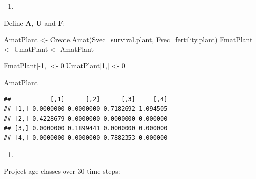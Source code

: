 \documentclass[
]{book}
\newenvironment{Shaded}{\begin{snugshade}}{\end{snugshade}}
\newcommand{\AttributeTok}[1]{\textcolor[rgb]{0.77,0.63,0.00}{#1}}
\newcommand{\DecValTok}[1]{\textcolor[rgb]{0.00,0.00,0.81}{#1}}
\newcommand{\FunctionTok}[1]{\textcolor[rgb]{0.00,0.00,0.00}{#1}}
\newcommand{\NormalTok}[1]{#1}
\newcommand{\OtherTok}[1]{\textcolor[rgb]{0.56,0.35,0.01}{#1}}
\newcommand{\SpecialCharTok}[1]{\textcolor[rgb]{0.00,0.00,0.00}{#1}}
\providecommand{\tightlist}{%
  \setlength{\itemsep}{0pt}\setlength{\parskip}{0pt}}
\begin{document}
\begin{enumerate}
\def\labelenumi{\arabic{enumi}.}
\setcounter{enumi}{2}
\tightlist
\item
\end{enumerate}

Define \(\mathbf{A}\), \(\mathbf{U}\) and \(\mathbf{F}\):

\begin{Shaded}
\begin{Highlighting}[]
\NormalTok{AmatPlant }\OtherTok{\textless{}{-}} \FunctionTok{Create.Amat}\NormalTok{(}\AttributeTok{Svec=}\NormalTok{survival.plant, }
                         \AttributeTok{Fvec=}\NormalTok{fertility.plant)}
\NormalTok{FmatPlant }\OtherTok{\textless{}{-}}\NormalTok{ UmatPlant }\OtherTok{\textless{}{-}}\NormalTok{ AmatPlant}

\NormalTok{FmatPlant[}\SpecialCharTok{{-}}\DecValTok{1}\NormalTok{,] }\OtherTok{\textless{}{-}} \DecValTok{0} 
\NormalTok{UmatPlant[}\DecValTok{1}\NormalTok{,] }\OtherTok{\textless{}{-}} \DecValTok{0}  

\NormalTok{AmatPlant}
\end{Highlighting}
\end{Shaded}

\begin{verbatim}
##           [,1]      [,2]      [,3]     [,4]
## [1,] 0.0000000 0.0000000 0.7182692 1.094505
## [2,] 0.4228679 0.0000000 0.0000000 0.000000
## [3,] 0.0000000 0.1899441 0.0000000 0.000000
## [4,] 0.0000000 0.0000000 0.7882353 0.000000
\end{verbatim}

\begin{enumerate}
\def\labelenumi{\arabic{enumi}.}
\setcounter{enumi}{3}
\tightlist
\item
\end{enumerate}

Project age classes over 30 time steps:
\end{document}
